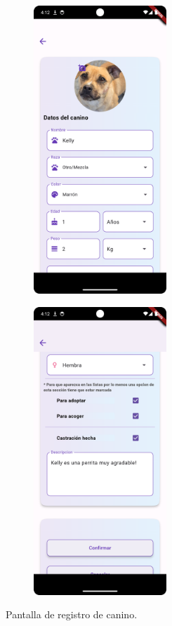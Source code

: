 \documentclass[a4paper, 12pt]{article}
\begin{document}
\begin{figure}[H]
   	\begin{subfigure}{0.48\textwidth}
		\begin{center}
			{\includegraphics[width=5cm]{app/RegisterDog1.png}\par}
		\end{center}  
	\end{subfigure}\hfill
   	\begin{subfigure}{0.48\textwidth}
		\begin{center}
			{\includegraphics[width=5cm]{app/RegisterDog2.png}\par}
		\end{center}  
	\end{subfigure}\hfill
	\caption{Pantalla de registro de canino.}
\end{figure}
\end{document}
